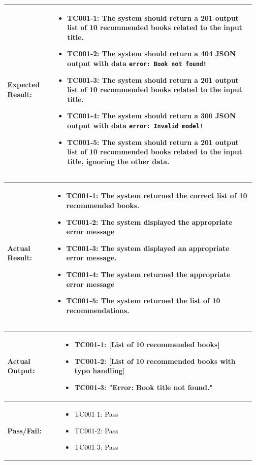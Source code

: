 \noindent
\begin{tabularx}{\textwidth}{|>{\raggedright\arraybackslash}p{4cm}|X|}
    \hline
    \textbf{Expected Result:} & 
    \begin{itemize}
        \item TC001-1: The system should return a 201 output list of 10 recommended books related to the input title.
        \item TC001-2: The system should return a 404 JSON output with data \texttt{error: Book not found!}
        \item TC001-3: The system should return a 201 output list of 10 recommended books related to the input title.
        \item TC001-4: The system should return a 300 JSON output with data \texttt{error: Invalid model!}
        \item TC001-5: The system should return a 201 output list of 10 recommended books related to the input title, ignoring the other data.
    \end{itemize}
    \\ \hline
\end{tabularx}

\noindent
\begin{tabularx}{\textwidth}{|>{\raggedright\arraybackslash}p{4cm}|X|}
    \hline
    \textbf{Actual Result:} & 
    \begin{itemize}
        \item TC001-1: The system returned the correct list of 10 recommended books.
        \item TC001-2: The system displayed the appropriate error message
        \item TC001-3: The system displayed an appropriate error message.
        \item TC001-4: The system returned the appropriate error message
        \item TC001-5: The system returned the list of 10 recommendations.
    \end{itemize}
    \\ \hline
\end{tabularx}

\noindent
\begin{tabularx}{\textwidth}{|>{\raggedright\arraybackslash}p{4cm}|X|}
    \hline
    \textbf{Actual Output:} & 
    \begin{itemize}
        \item TC001-1: [List of 10 recommended books]
        \item TC001-2: [List of 10 recommended books with typo handling]
        \item TC001-3: "Error: Book title not found."
    \end{itemize}
    \\ \hline
    \textbf{Pass/Fail:} & 
    \begin{itemize}
        \item TC001-1: Pass
        \item TC001-2: Pass
        \item TC001-3: Pass
    \end{itemize}
    \\ \hline
\end{tabularx}

